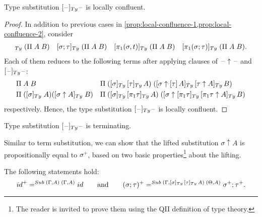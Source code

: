 \documentclass[a4paper,UKenglish,numberwithinsect,cleveref,thm-restate]{lipics-v2021}
\newcommand{\danger}{\marginpar[\hfill\dbend]{\dbend\hfill}}
\begin{document}
\begin{proposition}\label{prop:local-confluence-3}
  Type substitution $[\blank]_{\Ty}\blank$ is locally confluent.
  \danger
\end{proposition}
\begin{proof}
  In addition to previous cases in \cref{prop:local-confluence-1,prop:local-confluence-2}, consider
  \begin{align*}
    [\idS]_{\Ty}\;(\Pi\;A\;B) && [\sigma;\tau]_{\Ty}\;(\Pi\;A\;B) && [\pi_1(\sigma, t)]_{\Ty}\;(\Pi\;A\;B) && [\pi_1(\sigma; \tau)]_{\Ty}\;(\Pi\;A\;B).
  \end{align*}
  Each of them reduces to the following terms after applying clauses of $\mathord{\hspace{1pt}\text{--}\hspace{1pt}}\uparrow\mathord{\hspace{1pt}\text{--}\hspace{1pt}}$ and $[\blank]_{\Ty}\blank$:
  \begin{align*}
    & \Pi\;A\;B                && \Pi\;([\sigma]_{\Ty}\,[\tau]_{\Ty}\,A)\;([\sigma \uparrow [\tau]\,A ]_{\Ty}\,[\tau \uparrow A ]_{\Ty}\,B) \\
    & \Pi\;([\sigma]_{\Ty}\;A)([\sigma \uparrow A]_{\Ty}\;B) && \Pi\;([\sigma]_{\Ty}\,[\pi_1\tau]_{\Ty}\,A)\;([\sigma \uparrow [\pi_1\tau]_{\Ty}\,[\pi_1\tau \uparrow A]_{\Ty}\,B)
  \end{align*}
  respectively.
  Hence, the type substitution $[\blank]_{\Ty}\blank$ is locally confluent.
\end{proof}
\begin{proposition}[Termination]
  Type substitution $[\blank]_{\Ty}\blank$ is terminating.
  \danger
\end{proposition}

Similar to term substitution, we can show that the lifted substitution $\sigma \uparrow A$ is propositionally equal to $\sigma^+$, based on two basic properties\footnote{%
  The reader is invited to prove them using the QII definition of type theory.}
about the lifting.
\begin{lemma} \label{lem:lifting}
  The following statements hold:
  \[
    \idS^+ =^{\Sub\;(\Gamma, A)\;(\Gamma, A)} \idS
    \qquad\text{and}\qquad
    (\sigma; \tau)^+     =^{\Sub\;(\Gamma, [\sigma]_{\Ty}\,[\tau]_{\Ty}\,A)\;(\Theta, A)} \sigma^+ ; \tau^+.
  \]
\end{lemma}
\end{document}
